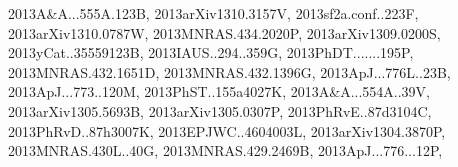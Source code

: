 \documentclass[12pt]{article}
\begin{document}
\begin{description}
{2013A&A...555A.123B,%
2013arXiv1310.3157V,%
2013sf2a.conf..223F,%
2013arXiv1310.0787W,%
2013MNRAS.434.2020P,%
2013arXiv1309.0200S,%
2013yCat..35559123B,%
2013IAUS..294..359G,%
2013PhDT.......195P,%
2013MNRAS.432.1651D,%
2013MNRAS.432.1396G,%
2013ApJ...776L..23B,%
2013ApJ...773..120M,%
2013PhST..155a4027K,%
2013A&A...554A..39V,%
2013arXiv1305.5693B,%
2013arXiv1305.0307P,%
2013PhRvE..87d3104C,%
2013PhRvD..87h3007K,%
2013EPJWC..4604003L,%
2013arXiv1304.3870P,%
2013MNRAS.430L..40G,%
2013MNRAS.429.2469B,%
2013ApJ...776...12P,%
}
\end{description}
\end{document}
